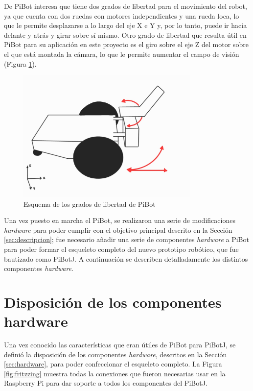 De PiBot interesa que tiene dos grados de libertad para el movimiento del robot, ya que cuenta con dos ruedas con motores independientes y una rueda loca, lo que le permite desplazarse a lo largo del eje X e Y y, por lo tanto, puede ir hacia delante y atrás y girar sobre sí mismo. Otro grado de libertad que resulta útil en PiBot para su aplicación en este proyecto es el giro sobre el eje Z del motor sobre el que está montada la cámara, lo que le permite aumentar el campo de visión (Figura \ref{fig:esquemaDOF}).


\begin{figure} [h!]
	\begin{center}
		\includegraphics[width=9cm]{figs/cap5/dof.jpg}
	\end{center}
	\caption{Esquema de los grados de libertad de PiBot} 
	\label{fig:esquemaDOF}
\end{figure}


Una vez puesto en marcha el PiBot, se realizaron una serie de modificaciones \textit{hardware} para poder cumplir con el objetivo principal descrito en la Sección \ref{sec:descripcion}; fue necesario añadir una serie de componentes \textit{hardware} a PiBot para poder formar el esqueleto completo del nuevo prototipo robótico, que fue bautizado como PiBotJ. A continuación se describen detalladamente los distintos componentes \textit{hardware}.

\section{Disposición de los componentes hardware}
\label{sec:disposicionhardware}

Una vez conocido las características que eran útiles de PiBot para PiBotJ, se definió la disposición de los componentes \textit{hardware}, descritos en la Sección \ref{sec:hardware}, para poder confeccionar el esqueleto completo. La Figura \ref{fig:fritzzing} muestra todas la conexiones que fueron necesarias usar en la Raspberry Pi para dar soporte a todos los componentes del PiBotJ. 

